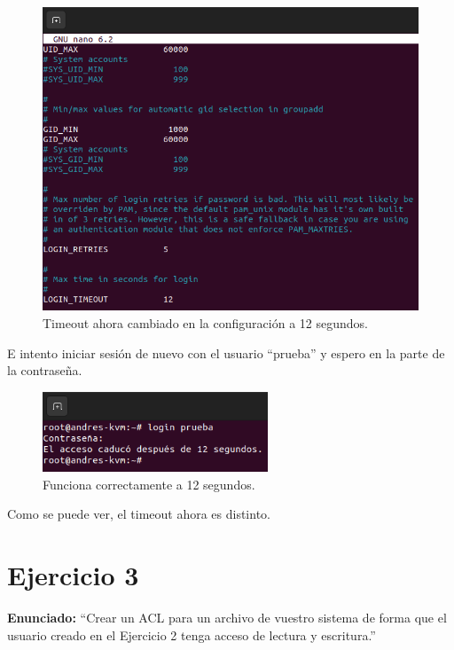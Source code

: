 \documentclass{article}
\begin{document}
\begin{figure}[H]
    \includegraphics[width=\textwidth]{imagenes/tout12.png}
    \caption{Timeout ahora cambiado en la configuración a 12 segundos.}
\end{figure}

\bigskip

E intento iniciar sesión de nuevo con el usuario ``prueba'' y espero en la parte de la contraseña.

\begin{figure}[H]
    \centering
    \includegraphics[width=0.6\textwidth]{imagenes/tout12login.png}
    \caption{Funciona correctamente a 12 segundos.}
\end{figure}

Como se puede ver, el timeout ahora es distinto.

\newpage

\section{Ejercicio 3}

\textbf{Enunciado: }``Crear un ACL para un archivo de vuestro sistema de forma que el usuario creado en el Ejercicio 2 tenga acceso de lectura y escritura.''
\end{document}
